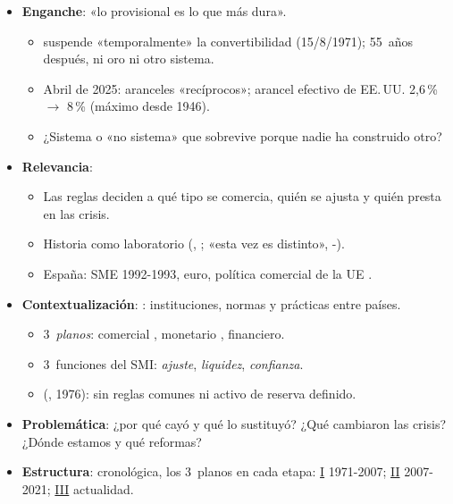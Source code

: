 \documentclass{article}
\begin{document}
\cabecerarepaso
\begin{columnas}

\begin{itemize}
\item \textbf{Enganche}: «lo provisional es lo que más dura».
  \begin{itemize}
  \item {} suspende «temporalmente» la convertibilidad (15/8/1971); 55~años después, ni oro ni otro sistema.
  \item Abril de 2025: aranceles «recíprocos»; arancel efectivo de EE.\,UU. 2,6\,\% $\to$ 8\,\% (máximo desde 1946).
  \item ¿Sistema o «no sistema» que sobrevive porque nadie ha construido otro?
  \end{itemize}
\item \textbf{Relevancia}:
  \begin{itemize}
  \item Las reglas deciden a qué tipo se comercia, quién se ajusta y quién presta en las crisis.
  \item Historia como laboratorio (, ; «esta vez es distinto», -).
  \item España: SME 1992-1993, euro, política comercial de la UE .
  \end{itemize}
\item \textbf{Contextualización}: : instituciones, normas y prácticas entre países.
  \begin{itemize}
  \item 3~\emph{planos}: comercial , monetario , financiero.
  \item 3~funciones del SMI: \emph{ajuste}, \emph{liquidez}, \emph{confianza}.
  \item {} (, 1976): sin reglas comunes ni activo de reserva definido.
  \end{itemize}
\item \textbf{Problemática}: ¿por qué cayó y qué lo sustituyó? ¿Qué cambiaron las crisis? ¿Dónde estamos y qué reformas?
\item \textbf{Estructura}: cronológica, los 3~planos en cada etapa: \hyperref[rep:I]{I} 1971-2007; \hyperref[rep:II]{II} 2007-2021; \hyperref[rep:III]{III} actualidad.
\end{itemize}


\end{columnas}
\end{document}
